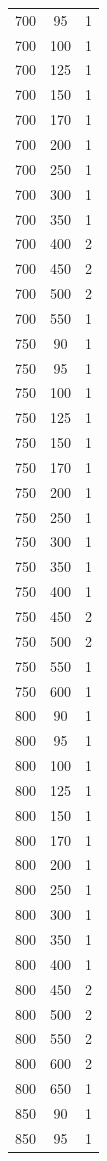 \begin{longtable}{c c c}
700 & 95 & 1 \\
700 & 100 & 1 \\
700 & 125 & 1 \\
700 & 150 & 1 \\
700 & 170 & 1 \\
700 & 200 & 1 \\
700 & 250 & 1 \\
700 & 300 & 1 \\
700 & 350 & 1 \\
700 & 400 & 2 \\
700 & 450 & 2 \\
700 & 500 & 2 \\
700 & 550 & 1 \\
750 & 90 & 1 \\
750 & 95 & 1 \\
750 & 100 & 1 \\
750 & 125 & 1 \\
750 & 150 & 1 \\
750 & 170 & 1 \\
750 & 200 & 1 \\
750 & 250 & 1 \\
750 & 300 & 1 \\
750 & 350 & 1 \\
750 & 400 & 1 \\
750 & 450 & 2 \\
750 & 500 & 2 \\
750 & 550 & 1 \\
750 & 600 & 1 \\
800 & 90 & 1 \\
800 & 95 & 1 \\
800 & 100 & 1 \\
800 & 125 & 1 \\
800 & 150 & 1 \\
800 & 170 & 1 \\
800 & 200 & 1 \\
800 & 250 & 1 \\
800 & 300 & 1 \\
800 & 350 & 1 \\
800 & 400 & 1 \\
800 & 450 & 2 \\
800 & 500 & 2 \\
800 & 550 & 2 \\
800 & 600 & 2 \\
800 & 650 & 1 \\
850 & 90 & 1 \\
850 & 95 & 1 \\

\end{longtable}
